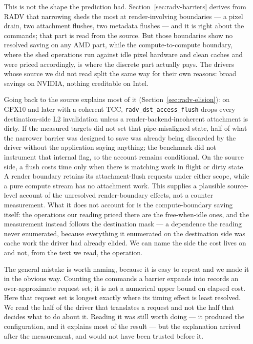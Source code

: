 \documentclass[10pt,twocolumn]{article}
\begin{document}
This is not the shape the prediction had. Section~\ref{sec:radv-barriers}
derives from RADV that narrowing sheds the most at render-involving boundaries
--- a pixel drain, two attachment flushes, two metadata flushes --- and it is
right about the commands; that part is read from the source. But those
boundaries show no resolved saving on any AMD part, while the
compute-to-compute boundary, where the shed operations run against idle pixel
hardware and clean caches and were priced accordingly, is where the discrete
part actually pays.
The drivers whose source we did not read split the same way for their own
reasons: broad savings on NVIDIA, nothing creditable on Intel.

Going back to the source explains most of it (Section~\ref{sec:radv-elision}):
on GFX10 and later with a coherent TCC, \texttt{radv\_dst\_access\_flush}
drops every destination-side L2 invalidation unless a render-backend-incoherent
attachment is dirty. If the measured targets did not set that pipe-misaligned
state, half of what the narrower barrier was designed to save was already being
discarded by the driver without the application saying anything; the
benchmark did not instrument that internal flag, so the account remains
conditional. On the source side, a flush costs time only when there is matching
work in flight or dirty state. A render boundary retains its attachment-flush
requests under either scope, while a pure compute stream has no attachment
work. This supplies a plausible source-level account of the unresolved
render-boundary effects, not a counter measurement. What it does not account
for is the compute-boundary
saving itself: the operations our reading priced there are the free-when-idle
ones, and the measurement instead follows the destination mask --- a
dependence the reading never enumerated, because everything it enumerated on
the destination side was cache work the driver had already elided. We can name
the side the cost lives on and not, from the text we read, the operation.

The general mistake is worth naming, because it is easy to repeat and we made
it in the obvious way. Counting the commands a barrier expands into records an
over-approximate request set; it is not a numerical upper bound on elapsed
cost. Here that request set is longest exactly where its timing effect is least
resolved. We read the half of the driver that translates a request and not the
half that decides what to do about it.
Reading it was still worth doing --- it produced the configuration, and it
explains most of the result --- but the explanation arrived after the
measurement, and would not have been trusted before it.
\end{document}
